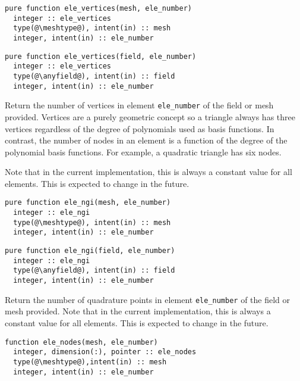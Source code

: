 \documentclass[a4paper, 11pt]{book}
\begin{document}

\begin{lstlisting}
pure function ele_vertices(mesh, ele_number)
  integer :: ele_vertices
  type(@\meshtype@), intent(in) :: mesh
  integer, intent(in) :: ele_number
\end{lstlisting}

\begin{lstlisting}
pure function ele_vertices(field, ele_number)
  integer :: ele_vertices
  type(@\anyfield@), intent(in) :: field
  integer, intent(in) :: ele_number
\end{lstlisting}

Return the number of vertices in element \lstinline+ele_number+ of the field
or mesh provided. Vertices are a purely geometric concept so a triangle
always has three vertices regardless of the degree of polynomials used as 
basis functions. In contrast, the number of nodes in an element is a
function of the degree of the polynomial basis functions. For example, a
quadratic triangle has six nodes.

Note that in the current implementation, this is always a
constant value for all elements. This is expected to change in the future.



\begin{lstlisting}
pure function ele_ngi(mesh, ele_number)
  integer :: ele_ngi
  type(@\meshtype@), intent(in) :: mesh
  integer, intent(in) :: ele_number
\end{lstlisting}

\begin{lstlisting}
pure function ele_ngi(field, ele_number)
  integer :: ele_ngi
  type(@\anyfield@), intent(in) :: field
  integer, intent(in) :: ele_number
\end{lstlisting}

Return the number of quadrature points in element \lstinline+ele_number+ of the field
or mesh provided. Note that in the current implementation, this is always a
constant value for all elements. This is expected to change in the future.


\begin{lstlisting}
function ele_nodes(mesh, ele_number)
  integer, dimension(:), pointer :: ele_nodes
  type(@\meshtype@),intent(in) :: mesh
  integer, intent(in) :: ele_number
\end{lstlisting}
\end{document}
